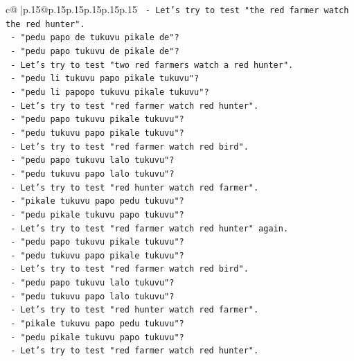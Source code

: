 \documentclass{article}
\begin{document}
{\begin{supertabular}{c@{$\;$}|p{.15\linewidth}@{}p{.15\linewidth}p{.15\linewidth}p{.15\linewidth}p{.15\linewidth}p{.15\linewidth}}
{{{\texttt{       {-} Let's try to test "the red farmer watch the red hunter".} \\
\texttt{         {-} "pedu papo de tukuvu pikale de"?} \\
\texttt{         {-} "pedu papo tukuvu de pikale de"?} \\
\texttt{       {-} Let's try to test "two red farmers watch a red hunter".} \\
\texttt{         {-} "pedu li tukuvu papo pikale tukuvu"?} \\
\texttt{         {-} "pedu li papopo tukuvu pikale tukuvu"?} \\
\texttt{       {-} Let's try to test "red farmer watch red hunter".} \\
\texttt{         {-} "pedu papo tukuvu pikale tukuvu"?} \\
\texttt{         {-} "pedu tukuvu papo pikale tukuvu"?} \\
\texttt{       {-} Let's try to test "red farmer watch red bird".} \\
\texttt{         {-} "pedu papo tukuvu lalo tukuvu"?} \\
\texttt{         {-} "pedu tukuvu papo lalo tukuvu"?} \\
\texttt{       {-} Let's try to test "red hunter watch red farmer".} \\
\texttt{         {-} "pikale tukuvu papo pedu tukuvu"?} \\
\texttt{         {-} "pedu pikale tukuvu papo tukuvu"?} \\
\texttt{       {-} Let's try to test "red farmer watch red hunter" again.} \\
\texttt{         {-} "pedu papo tukuvu pikale tukuvu"?} \\
\texttt{         {-} "pedu tukuvu papo pikale tukuvu"?} \\
\texttt{       {-} Let's try to test "red farmer watch red bird".} \\
\texttt{         {-} "pedu papo tukuvu lalo tukuvu"?} \\
\texttt{         {-} "pedu tukuvu papo lalo tukuvu"?} \\
\texttt{       {-} Let's try to test "red hunter watch red farmer".} \\
\texttt{         {-} "pikale tukuvu papo pedu tukuvu"?} \\
\texttt{         {-} "pedu pikale tukuvu papo tukuvu"?} \\
\texttt{       {-} Let's try to test "red farmer watch red hunter".} \\
}}}
\end{supertabular}}
\end{document}
